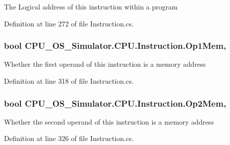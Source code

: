 The Logical address of this instruction within a program 



Definition at line 272 of file Instruction.\+cs.

\hypertarget{class_c_p_u___o_s___simulator_1_1_c_p_u_1_1_instruction_ae5666173d24e27d25d16e1e1f0bb10a3}{}
\subsubsection[{Op1\+Mem}]{\setlength{\rightskip}{0pt plus 5cm}bool C\+P\+U\+\_\+\+O\+S\+\_\+\+Simulator.\+C\+P\+U.\+Instruction.\+Op1\+Mem\hspace{0.3cm}{\ttfamily [get]}, {\ttfamily [set]}}\label{class_c_p_u___o_s___simulator_1_1_c_p_u_1_1_instruction_ae5666173d24e27d25d16e1e1f0bb10a3}


Whether the first operand of this instruction is a memory address 



Definition at line 318 of file Instruction.\+cs.

\hypertarget{class_c_p_u___o_s___simulator_1_1_c_p_u_1_1_instruction_ace33aaf155d1f6a727337811538665b6}{}
\subsubsection[{Op2\+Mem}]{\setlength{\rightskip}{0pt plus 5cm}bool C\+P\+U\+\_\+\+O\+S\+\_\+\+Simulator.\+C\+P\+U.\+Instruction.\+Op2\+Mem\hspace{0.3cm}{\ttfamily [get]}, {\ttfamily [set]}}\label{class_c_p_u___o_s___simulator_1_1_c_p_u_1_1_instruction_ace33aaf155d1f6a727337811538665b6}


Whether the second operand of this instruction is a memory address 



Definition at line 326 of file Instruction.\+cs.

